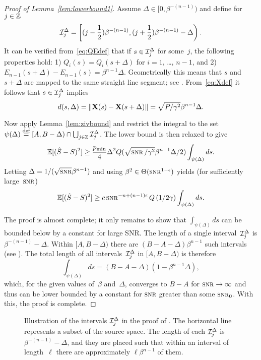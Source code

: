 \begin{proof}[Proof of Lemma~\ref{lem:lowerbound1}]
  Assume $\Delta \in [0, \beta^{-(n-1)})$ and define for $j \in \mathbb{Z}$
  \[ \mathcal{I}_j^\Delta = \left[ (j - \frac12 )\beta^{-(n-1)}, 
    (j + \frac12 ) \beta^{-(n-1)} - \Delta \right).\]
  It can be verified from~\eqref{eq:QEdef} that if $s \in \mathcal{I}_j^\Delta$ for
  some~$j$, the following properties hold: 1) $Q_i(s) = Q_i(s+\Delta)$ for
  $i=1$, \dots, $n-1$, and 2) $E_{n-1}(s+\Delta) - E_{n-1}(s) =
  \beta^{n-1}\Delta$. Geometrically this means that $s$ and~$s + \Delta$ are
  mapped to the same straight line segment; see .
  From~\eqref{eq:Xdef} it follows that $s \in \mathcal{I}_j^\Delta$ implies
  \begin{equation*}
    d(s, \Delta) = \|\mathbf{X}(s) - \mathbf{X}(s+\Delta)\| = \sqrt{P/\gamma^2}
    \beta^{n-1}\Delta.
  \end{equation*}

  Now apply Lemma~\ref{lem:zivbound} and restrict the integral to the
  set~$\psi(\Delta) \stackrel{\text{def}}{=} [A,B-\Delta) \cap \bigcup_{j\in\mathbb{Z}} \mathcal{I}_j^\Delta$. The
  lower bound is then relaxed to give
  \begin{equation*}
    \mse \ge \frac{\pmin}{4} \Delta^2 Q(\sqrt{\snr/\gamma^2} \beta^{n-1}
    \Delta/2) \int_{\psi(\Delta)} ds.
  \end{equation*}
  Letting $\Delta = 1/(\sqrt{\snr}\beta^{n-1})$ and using $\beta^2 \in
  \Theta(\snr^{1-\e})$ yields (for sufficiently large~$\snr$)
  \begin{equation*}
    \mse \ge c \snr^{-n+(n-1)\e} Q\left(1/2\gamma\right)
    \int_{\psi(\Delta)} ds.
  \end{equation*}

  The proof is almost complete; it only remains to show that
  $\int_{\psi(\Delta)}ds$ can be bounded below by a constant for large SNR. The
  length of a single interval~$\mathcal{I}_j^\Delta$ is $\beta^{-(n-1)} - \Delta$. Within
  $[A,B-\Delta)$ there are $(B-A-\Delta)\beta^{n-1}$ such intervals (see
  ). The total
  length of all intervals~$\mathcal{I}_j^\Delta$ in $[A, B-\Delta)$ is therefore
  \[ \int_{\psi(\Delta)} ds = (B-A-\Delta)
  (1 - \beta^{n-1}\Delta), \]
  which, for the given values of~$\beta$ and~$\Delta$, 
  converges to $B-A$ for $\snr \ra \infty$ and thus can be lower bounded by a
  constant for $\snr$ greater than some $\snr_0$. With this, the proof is
  complete.
\end{proof}

\begin{figure}
  \begin{center}
    
  \end{center}
  \caption{Illustration of the intervals $\mathcal{I}_j^\Delta$ in the proof of
  . The horizontal line represents a subset of the source
  space. The length of each $\mathcal{I}_j^\Delta$ is $\beta^{-(n-1)} -
  \Delta$, and they are placed such that within an interval of length~$\ell$
  there are approximately $\ell \beta^{n-1}$ of them.}
  \label{fig:lowerbound1intervals}
\end{figure}

